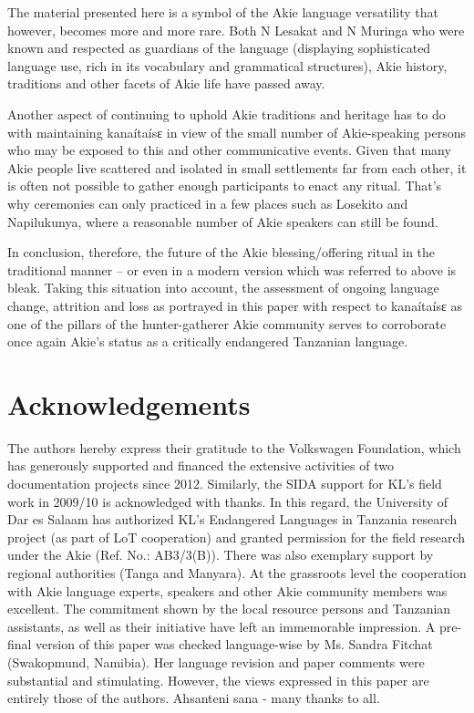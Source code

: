\documentclass[output=paper,colorlinks,citecolor=brown]{langscibook}
\begin{document}
The material presented here is a symbol of the Akie language versatility that however, becomes more and more rare. Both N Lesakat and N Muringa who were known and respected as guardians of the language (displaying sophisticated language use, rich in its vocabulary and grammatical structures), Akie history, traditions and other facets of Akie life  have passed away. 

Another aspect of continuing to uphold Akie traditions and heritage has to do with maintaining kanaítaísɛ in view of the small number of Akie-speaking persons who may be exposed to this and other communicative events. Given that many Akie people live scattered and isolated in small settlements far from each other, it is often not possible to gather enough participants to enact any ritual. That’s why ceremonies can only practiced in a few places such as Losekito and Napilukunya, where a reasonable number of Akie speakers can still be found.

In conclusion, therefore, the future of the Akie blessing/offering ritual in the traditional manner – or even in a modern version which was referred to above is bleak. Taking this situation into account, the assessment of ongoing language change, attrition and loss as portrayed in this paper with respect to kanaítaísɛ as one of the pillars of the hunter-gatherer Akie community serves to corroborate once again Akie’s status as a critically endangered Tanzanian language.




\section*{Acknowledgements}
The authors hereby express their gratitude to the Volkswagen Foundation, which has generously supported and financed the extensive activities of two documentation projects since 2012. Similarly, the SIDA support for KL's field work in 2009/10 is acknowledged with thanks. In this regard, the University of Dar es Salaam has authorized KL's Endangered Languages in Tanzania research project (as part of LoT cooperation) and granted permission for the field research under the Akie (Ref. No.: AB3/3(B)). There was also exemplary support by regional authorities (Tanga and Manyara). At the grassroots level the cooperation with Akie language experts, speakers and other Akie community members was excellent. The commitment shown by the local resource persons and Tanzanian assistants, as well as their initiative have left an immemorable impression. A pre-final version of this paper was checked language-wise by Ms. Sandra Fitchat (Swakopmund, Namibia). Her language revision and paper comments were substantial and stimulating. However, the views expressed in this paper are entirely those of the authors. 
Ahsanteni sana - many thanks to all.
\end{document}
